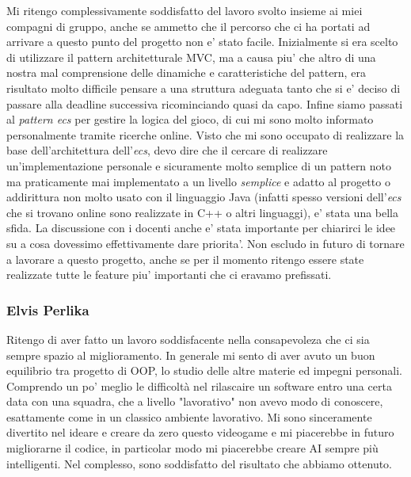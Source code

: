 \documentclass[a4paper,12pt]{report}
\begin{document}
Mi ritengo complessivamente soddisfatto del lavoro svolto insieme ai miei compagni di gruppo, anche se ammetto che il percorso che ci ha portati ad arrivare a questo punto del progetto non e' stato facile. Inizialmente si era scelto di utilizzare il pattern architetturale MVC, ma a causa piu' che altro di una nostra mal comprensione delle dinamiche e caratteristiche del pattern, era risultato molto difficile pensare a una struttura adeguata tanto che si e' deciso di passare alla deadline successiva ricominciando quasi da capo. Infine siamo passati al \textit{pattern ecs} per gestire la logica del gioco, di cui mi sono molto informato personalmente tramite ricerche online. Visto che mi sono occupato di realizzare la base dell'architettura dell'\textit{ecs}, devo dire che il cercare di realizzare un'implementazione personale e sicuramente molto semplice di un pattern noto ma praticamente mai implementato a un livello \textit{semplice} e adatto al progetto o addirittura non molto usato con il linguaggio Java (infatti spesso versioni dell'\textit{ecs} che si trovano online sono realizzate in C++ o altri linguaggi), e' stata una bella sfida. La discussione con i docenti anche e' stata importante per chiarirci le idee su a cosa dovessimo effettivamente dare priorita'. Non escludo in futuro di tornare a lavorare a questo progetto, anche se per il momento ritengo essere state realizzate tutte le feature piu' importanti che ci eravamo prefissati.

\subsubsection{Elvis Perlika}
Ritengo di aver fatto un lavoro soddisfacente nella consapevoleza che ci sia sempre spazio
al miglioramento.
In generale mi sento di aver avuto un buon equilibrio tra progetto di OOP, lo studio delle
altre materie ed impegni personali.
Comprendo un po' meglio le difficoltà nel rilascaire un software entro una certa 
data con una squadra, che a livello "lavorativo" non avevo modo di conoscere, esattamente come
in un classico ambiente lavorativo. 
Mi sono sinceramente divertito nel ideare e creare da zero questo videogame e mi piacerebbe 
in futuro migliorarne il codice, in particolar modo mi piacerebbe creare AI sempre più intelligenti. 
Nel complesso, sono soddisfatto del risultato che abbiamo ottenuto.
\end{document}
